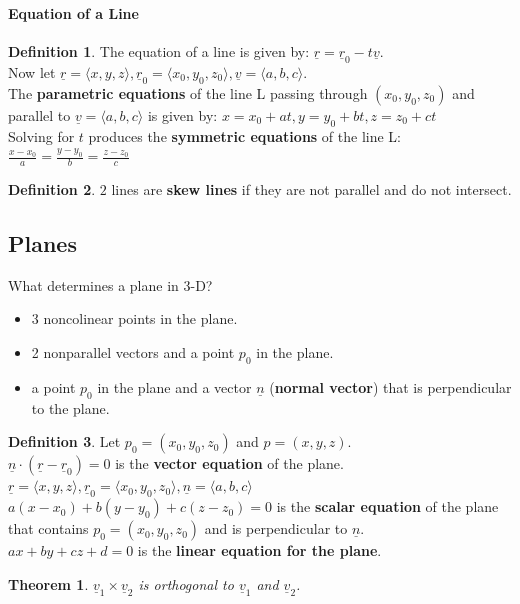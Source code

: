 \documentclass[12 pt]{article}
\newtheorem{thm}{Theorem}
\theoremstyle{definition}
\newtheorem{defn}{Definition}
\begin{document}
\paragraph{Equation of a Line}
\begin{defn}
	The equation of a line is given by: $\underline{r}=\underline{r}_0-t\underline{v}$.
	\\ Now let $\underline{r}=\langle x,y,z \rangle, \underline{r}_0=\langle x_0, y_0, z_0 \rangle, \underline{v}=\langle a,b,c \rangle$.
	\\ The \textbf{parametric equations} of the line L passing through $(x_0,y_0,z_0)$ and parallel to $\underline{v}=\langle a,b,c \rangle$ is given by: $x=x_0+at,y=y_0+bt,z=z_0+ct$
	\\ Solving for $t$ produces the \textbf{symmetric equations} of the line L: $\frac{x-x_0}{a}=\frac{y-y_0}{b}=\frac{z-z_0}{c}$
\end{defn}
\begin{defn}
	$2$ lines are \textbf{skew lines} if they are not parallel and do not intersect.
\end{defn}
\subsection{Planes}
What determines a plane in 3-D?
\begin{itemize}
	\item 3 noncolinear points in the plane.
	\item 2 nonparallel vectors and a point $p_0$ in the plane.
	\item a point $p_0$ in the plane and a vector $\underline{n}$ (\textbf{normal vector}) that is perpendicular to the plane. 
\end{itemize}
\begin{defn}
	Let $p_0=(x_0,y_0,z_0)$ and $p=(x,y,z)$.
	\\$\underline{n}\cdot (\underline{r}-\underline{r}_0)=0$ is the \textbf{vector equation} of the plane.
	\\$\underline{r}=\langle x,y,z \rangle, \underline{r}_0=\langle x_0,y_0,z_0 \rangle, \underline{n}=\langle a,b,c \rangle$  
	\\ $a(x-x_0)+b(y-y_0)+c(z-z_0)=0$ is the \textbf{scalar equation} of the plane that contains $p_0=(x_0,y_0,z_0)$ and is perpendicular to $\underline{n}$. 
	\\ $ax+by+cz+d=0$ is the \textbf{linear equation for the plane}.
\end{defn}
\begin{thm}
	$\underline{v}_1 \times \underline{v}_2$ is orthogonal to $\underline{v}_1$ and $\underline{v}_2$.
\end{thm}
\end{document}
